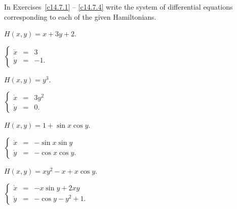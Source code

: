 \documentclass{ximera}
\begin{document}
\noindent In Exercises~\ref{c14.7.1} -- \ref{c14.7.4} write the system of 
differential equations corresponding to each of the given Hamiltonians. 
\begin{exercise} \label{c14.7.1}
$H(x,y) = x+3y+2$.

\begin{solution}
\ans $\left\{\begin{array}{rcl}
	\dot{x} & = & 3 \\ \dot{y} & = & -1. \end{array}\right.$


\end{solution}
\end{exercise}
\begin{exercise} \label{c14.7.2}
$H(x,y) = y^3$.

\begin{solution}
\ans $\left\{\begin{array}{rcl}
	\dot{x} & = & 3y^2 \\ \dot{y} & = & 0. \end{array}\right.$

\end{solution}
\end{exercise}
\begin{exercise} \label{c14.7.3}
$H(x,y) = 1 + \sin x \cos y$.

\begin{solution}
\ans $\left\{\begin{array}{rcl}
\dot{x} & = & -\sin x\sin y \\ \dot{y} & = & -\cos x\cos y. \end{array}\right.$

\end{solution}
\end{exercise}
\begin{exercise} \label{c14.7.4}
$H(x,y) = xy^2 - x + x\cos y$.

\begin{solution}
\ans $\left\{\begin{array}{rcl}
\dot{x} & = & -x\sin y + 2xy \\ \dot{y} & = & -\cos y -y^2 +1. \end{array}\right.$


\end{solution}
\end{exercise}
\end{document}
